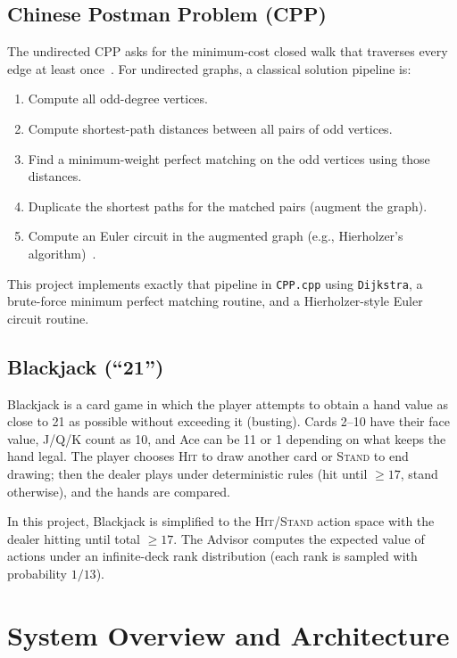 \documentclass[conference]{IEEEtran}
\begin{document}
\subsection{Chinese Postman Problem (CPP)}
The undirected CPP asks for the minimum-cost closed walk that traverses every edge at least once~\cite{ref_mit_urban}.
For undirected graphs, a classical solution pipeline is:
\begin{enumerate}
    \item Compute all odd-degree vertices.
    \item Compute shortest-path distances between all pairs of odd vertices.
    \item Find a minimum-weight perfect matching on the odd vertices using those distances.
    \item Duplicate the shortest paths for the matched pairs (augment the graph).
    \item Compute an Euler circuit in the augmented graph (e.g., Hierholzer's algorithm)~\cite{ref_hierholzer}.
\end{enumerate}
This project implements exactly that pipeline in \texttt{CPP.cpp} using \texttt{Dijkstra}, a brute-force minimum perfect matching routine, and a Hierholzer-style Euler circuit routine.

\subsection{Blackjack (``21'')}
Blackjack is a card game in which the player attempts to obtain a hand value as close to 21 as possible without exceeding it (busting).
Cards 2--10 have their face value, J/Q/K count as 10, and Ace can be 11 or 1 depending on what keeps the hand legal.
The player chooses \textsc{Hit} to draw another card or \textsc{Stand} to end drawing; then the dealer plays under deterministic rules (hit until $\ge 17$, stand otherwise), and the hands are compared.

In this project, Blackjack is simplified to the \textsc{Hit}/\textsc{Stand} action space with the dealer hitting until total $\ge 17$.
The Advisor computes the expected value of actions under an infinite-deck rank distribution (each rank is sampled with probability $1/13$).

\section{System Overview and Architecture}
\end{document}
